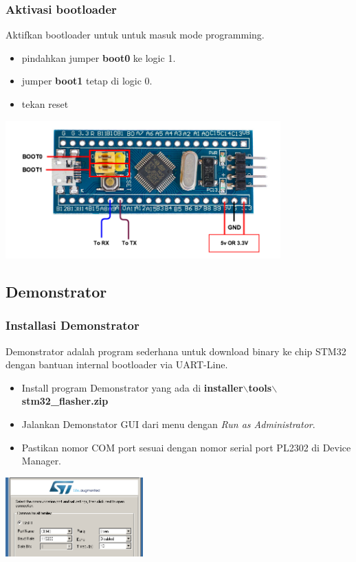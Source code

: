 \documentclass[table,dvipsnames]{beamer}
\begin{document}
	\begin{frame}
		\frametitle{Aktivasi bootloader}
		\begin{exampleblock}{}
			Aktifkan bootloader untuk untuk masuk mode programming.
			\begin{itemize}
				\item pindahkan jumper \textbf{boot0} ke logic 1.
				\item jumper \textbf{boot1} tetap di logic 0.
				\item tekan reset
			\end{itemize}
		\end{exampleblock}

		\begin{center}
			\includegraphics[width=300pt]{images/flashing}
		\end{center}
	\end{frame}

	\subsection{Demonstrator}
	\begin{frame}
		\frametitle{Installasi Demonstrator}
		\begin{exampleblock}{}
			Demonstrator adalah program sederhana untuk download binary ke chip STM32 dengan bantuan internal bootloader via UART-Line.
			\begin{itemize}
				\item Install program Demonstrator yang ada di \textbf{installer$\backslash$tools$\backslash$stm32\_flasher.zip}
				\item Jalankan Demonstator GUI dari menu dengan \textit{Run as Administrator}.
				\item Pastikan nomor COM port sesuai dengan nomor serial port PL2302 di Device Manager.
			\end{itemize}
		\end{exampleblock}

		\begin{center}
			\includegraphics[width=150pt]{images/demons}
		\end{center}
	\end{frame}
\end{document}
